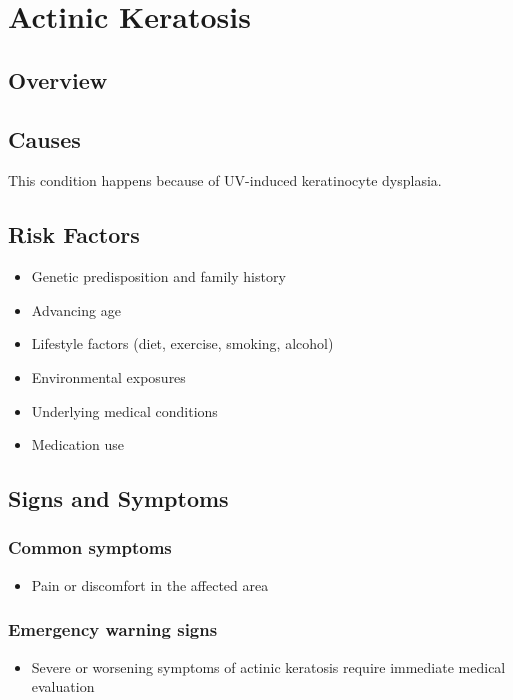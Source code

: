 \chapter{Actinic Keratosis}
\label{sec:Actinic Keratosis}

\section{Overview}

\section{Causes}
This condition happens because of UV-induced keratinocyte dysplasia.     
\section{Risk Factors}

\begin{itemize}[noitemsep]
  \item Genetic predisposition and family history
  \item Advancing age
  \item Lifestyle factors (diet, exercise, smoking, alcohol)
  \item Environmental exposures
  \item Underlying medical conditions
  \item Medication use
\end{itemize}
\section{Signs and Symptoms}

\subsection{Common symptoms}
\begin{itemize}[noitemsep]
  \item Pain or discomfort in the affected area
  \end{itemize}

\subsection{Emergency warning signs}
\begin{itemize}[noitemsep]
  \item Severe or worsening symptoms of actinic keratosis require immediate medical evaluation
\end{itemize}
